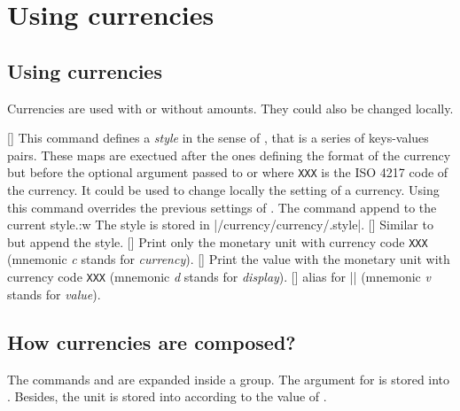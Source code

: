 \documentclass[12pt,add-index]{cnltx-doc}
\begin{document}
\section{Using currencies}
\label{sec:using}

\subsection{Using currencies}

Currencies are used with or without amounts. They could also be changed locally. 

\begin{commands}
    []
    This command defines a \emph{style} in the sense of , that 
    is a series of keys-values pairs.  
    These maps are exectued after
    the ones defining the format of the currency but before the optional 
    argument passed to  or  where \texttt{XXX} is
    the ISO 4217 code of the currency. It could be used to change locally 
    the setting of a currency. Using this command overrides the previous settings of
    . The command  append to the current style.:w
    The style is stored in \verbcode|/currency/currency/.style|.
    [] Similar to  but 
    append the style.
    [] Print only the monetary unit with currency code \texttt{XXX}
    (mnemonic \textit{c} stands for \textit{currency}).
    [] Print the value with the monetary unit with currency code \texttt{XXX} (mnemonic \textit{d} stands for \textit{display}).
    []
    alias for \verbcode|\dXXX| (mnemonic \textit{v} stands for \textit{value}).
\end{commands}

\subsection{How currencies are composed?}

The commands  and  are expanded inside a group. 
The argument  for  is stored into .
Besides, the unit is stored into  according 
to the value of .
\end{document}
